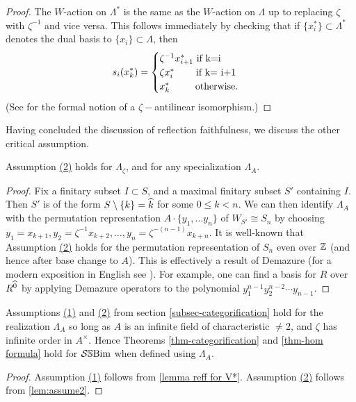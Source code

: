 \begin{proof} The $W$-action on $\Lambda^*$ is the same as the $W$-action on $\Lambda$ up to replacing $\zeta$ with $\zeta^{-1}$ and vice versa. 
This follows immediately by checking that if $\{x_i^*\} \subset \Lambda^*$ denotes the dual basis to $\{x_i\} \subset \Lambda$, then 
$$
s_i(x_k^*)=
\begin{cases}
 \zeta^{-1}x_{i+1}^* \text{ if k=i}\\
 \zeta x_i^* \hspace{19pt}\text{ if k= i+1} \\
 x_k^* \hspace{23 pt}\text{ otherwise}.
\end{cases}
$$
(See \cite[Proposition 2.15]{EJY1} for the formal notion of a $\zeta-$antilinear isomorphism.)\end{proof}

Having concluded the discussion of reflection faithfulness, we discuss the other critical assumption.

\begin{lemma} \label{lem:assume2} Assumption  \hyperref[assumption 2]{(2)} holds for $\Lambda_{\zeta}$, and for any specialization $\Lambda_A$. \end{lemma}

\begin{proof} Fix a finitary subset $I\subset S$, and a maximal finitary subset $S'$ containing $I$. 
Then $S'$ is of the form $S\setminus\{k\}=\widehat{k}$ for some $0\le k< n.$ 
We can then identify $\Lambda_A$ with the permutation representation $A \cdot \{y_1, \ldots y_n\}$ of  $W_{S'} \cong S_n$ by choosing $y_1=x_{k+1}, y_2=\zeta^{-1} x_{k+2}, \ldots, y_n=\zeta^{-(n-1)}x_{k+n}.$
It is well-known that Assumption \hyperref[assumption 2]{(2)} holds for the permutation representation of $S_n$ even over $\mathbb{Z}$ (and hence after base change to $A$). This is effectively a result of Demazure \cite{Demazure} (for a modern exposition in English see \cite[Theorem 4.2]{EKLP}). For example, one can find a basis for $R$ over $R^{\widehat{0}}$ by applying Demazure operators to the polynomial $y_1^{n-1} y_2^{n-2} \cdots y_{n-1}$. \end{proof}

\begin{theorem}
Assumptions \hyperref[assumption 1]{(1)} and \hyperref[assumption 2]{(2)}  from section \ref{subsec-categorification} hold for the realization $\Lambda_{A}$ so long as $A$ is an infinite field of characteristic $\ne 2$, and $\zeta$ has infinite order in $A^{\times}$. Hence Theorems \ref{thm-categorification} and \ref{thm-hom formula} hold for $\mathcal{S}\mathbb{S}\text{Bim}$ when defined using $\Lambda_{A}$.
        
\end{theorem}
\begin{proof}
Assumption \hyperref[assumption 1]{(1)} follows from \cref{lemma reff for V*}.
Assumption \hyperref[assumption 2]{(2)} follows from \cref{lem:assume2}.
\end{proof}

